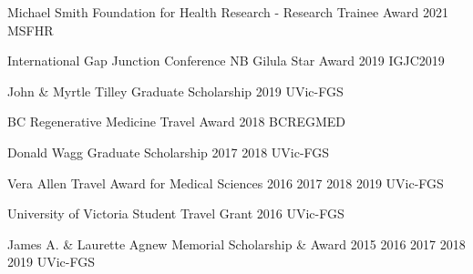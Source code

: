 



\begin{cvhonors}

  \cvhonor
  {Michael Smith Foundation for Health Research - Research Trainee Award} %
  {2021} %
  {MSFHR} %
  {} %

  \cvhonor
    {International Gap Junction Conference NB Gilula Star Award} %
    {2019} %
    {IGJC2019} %
    {} %

  \cvhonor
    {John \& Myrtle Tilley Graduate Scholarship} %
    {2019} %
    {UVic-FGS} %
    {} %

  \cvhonor
    {BC Regenerative Medicine Travel Award} %
    {2018} %
    {BCREGMED} %
    {} %

  \cvhonor
    {Donald Wagg Graduate Scholarship} %
    {2017 2018} %
    {UVic-FGS} %
    {} %

  \cvhonor
    {Vera Allen Travel Award for Medical Sciences} %
    {2016 2017 2018 2019} %
    {UVic-FGS} %
    {} %

  \cvhonor
    {University of Victoria Student Travel Grant} %
    {2016} %
    {UVic-FGS} %
    {} %

  \cvhonor
    {James A. \& Laurette Agnew Memorial Scholarship \& Award} %
    {2015 2016 2017 2018 2019} %
    {UVic-FGS} %
    {} %


\end{cvhonors}
